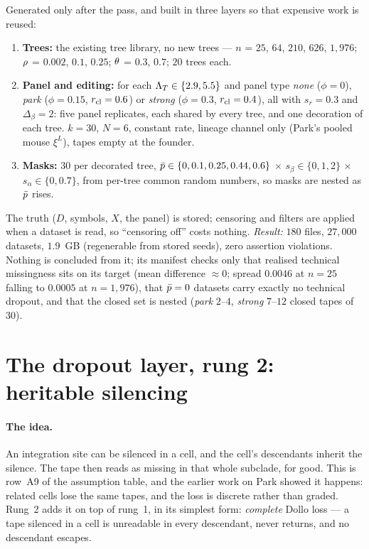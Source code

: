 Generated only after the pass, and built in three layers so that expensive work is reused:
\begin{enumerate}
  \item \textbf{Trees:} the existing tree library, no new trees --- $n$ = $25$, $64$, $210$, $626$, $1{,}976$;
        $\rho$ = $0.002$, $0.1$, $0.25$; $\theta$ = $0.3$, $0.7$; $20$ trees each.
  \item \textbf{Panel and editing:} for each $\Lambda_T\in\{2.9,5.5\}$ and panel type \emph{none}
        ($\phi=0$), \emph{park} ($\phi=0.15$, $r_{\rm cl}=0.6$) or \emph{strong} ($\phi=0.3$,
        $r_{\rm cl}=0.4$), all with $s_r=0.3$ and $\Delta_\beta=2$: five panel replicates, each shared
        by every tree, and one decoration of each tree. $k=30$, $N=6$, constant rate, lineage channel
        only (Park's pooled mouse $\xi^L$), tapes empty at the founder.
  \item \textbf{Masks:} $30$ per decorated tree, $\bar p\in\{0,0.1,0.25,0.44,0.6\}$ $\times$
        $s_\beta\in\{0,1,2\}$ $\times$ $s_\alpha\in\{0,0.7\}$, from per-tree common random numbers, so
        masks are nested as $\bar p$ rises.
\end{enumerate}
The truth ($D$, symbols, $X$, the panel) is stored; censoring and filters are applied when a dataset
is read, so ``censoring off'' costs nothing. \emph{Result:} $180$ files, $27{,}000$ datasets, $1.9$~GB
(regenerable from stored seeds), zero assertion violations. Nothing is concluded from it; its manifest
checks only that realised technical missingness sits on its target (mean difference $\approx0$; spread
$0.0046$ at $n=25$ falling to $0.0005$ at $n=1{,}976$), that $\bar p=0$ datasets carry exactly no
technical dropout, and that the closed set is nested (\emph{park} $2$--$4$, \emph{strong} $7$--$12$
closed tapes of $30$).

\section{The dropout layer, rung 2: heritable silencing}\label{sec:drop2}

\paragraph{The idea.} An integration site can be silenced in a cell, and the cell's descendants
inherit the silence. The tape then reads as missing in that whole subclade, for good. This is row~A9
of the assumption table, and the earlier work on Park showed it happens: related cells lose the same
tapes, and the loss is discrete rather than graded. Rung~2 adds it on top of rung~1, in its simplest
form: \emph{complete} Dollo loss --- a tape silenced in a cell is unreadable in every descendant, never
returns, and no descendant escapes.

